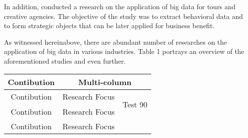 In addition, \cite{Zhang2019a} conducted a research on the application of big data for tours and creative agencies. The objective of the study was to extract behavioral data and to form strategic objects that can be later applied for business benefit.

As witnessed hereinabove, there are abundant number of researches on the application of big data in various industries. Table 1 portrays an overview of the aforementioned studies and even further.

\begin{center}
    \begin{tabular}{|c|c|c|}
        \hline
        Contibution & \multicolumn{2}{c|}{Multi-column}                                              \\

        \hline
        Contibution & Research Focus                    & \multirow{2}{*}{\begin{turn}{-90} Test 90 \end{turn}} \\

        Contibution & Research Focus                    &                                            \\

        Contibution & Research Focus                    &                                            \\

        \hline
    \end{tabular}
\end{center}


